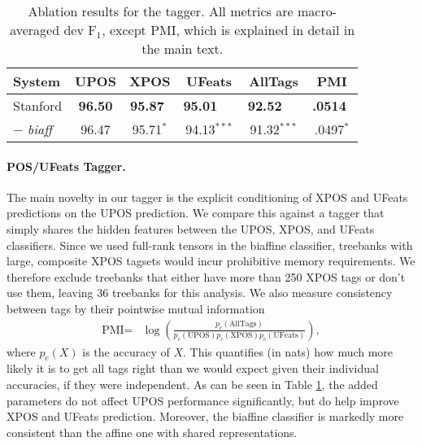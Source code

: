 \documentclass[11pt,a4paper]{article}
\newcommand{\fone}{$\text{F}_1$}
\begin{document}
\begin{table}[t]
  \centering
  \small
  \setlength{\tabcolsep}{0.4em}
  \begin{tabular}{lccccc}
  \toprule
  System & UPOS & XPOS & UFeats & AllTags & PMI\\
  \midrule
  Stanford & \textbf{96.50} & \textbf{95.87}$^{\phantom{*}}$ & \textbf{95.01}$^{\phantom{***}}$ & \textbf{92.52}$^{\phantom{***}}$ & {\small \textbf{.0514}$\phantom{^*}$}\\
  $-$ \textit{biaff} & 96.47 & 95.71$^{*}$ & 94.13$^{***}$ & 91.32$^{***}$ & {\small .0497$^{*}$}\\
  \bottomrule
  \end{tabular}
  \caption{Ablation results for the tagger. All metrics are macro-averaged dev \fone{}, except PMI, which is explained in detail in the main text.}\label{tab:tagger_ablation}
  \end{table}

\paragraph{POS/UFeats Tagger.}
The main novelty in our tagger is the explicit conditioning of XPOS and UFeats predictions on the UPOS prediction. We compare this against a tagger that simply shares the hidden features between the UPOS, XPOS, and UFeats classifiers.
Since we used full-rank tensors in the biaffine classifier, treebanks with large, composite XPOS tagsets would incur prohibitive memory requirements.
We therefore exclude treebanks that either have more than 250 XPOS tags or don't use them, leaving 36 treebanks for this analysis.
We also measure consistency between tags by their pointwise mutual information
\begin{align*}
\text{PMI}=& \log\left(\frac{p_c(\text{AllTags})}{p_c(\text{UPOS})p_c(\text{XPOS})p_c(\text{UFeats})}\right),
\end{align*}
where $p_c(X)$ is the accuracy of $X$.
This quantifies (in nats) how much more likely it is to get all tags right than we would expect given their individual accuracies, if they were independent.
As can be seen in Table \ref{tab:tagger_ablation}, the added parameters do not affect UPOS performance significantly, but do help improve XPOS and UFeats prediction. Moreover, the biaffine classifier is markedly more consistent than the affine one with shared representations.
\end{document}
